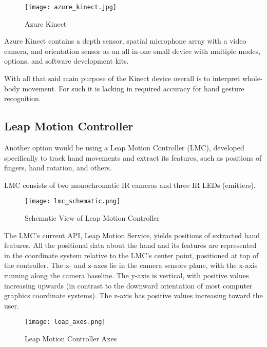 \begin{figure}[ht]
	\centering
    \texttt{[image: azure\_kinect.jpg]}
	\caption{Azure Kinect \cite{azurekinect_pic}}
	\label{fig:azureKincet}
\end{figure}

Azure Kinect contains a depth sensor, spatial microphone array with a video camera, and orientation sensor as an all in-one small device with multiple modes, options, and software development kits.\cite{azurekinect}

With all that said main purpose of the Kinect device overall is to interpret whole-body movement. For such it is lacking in required accuracy for hand gesture recognition. 

\subsection{Leap Motion Controller}

Another option would be using a Leap Motion Controller (LMC), developed specifically to track hand movements and extract its features, such as positions of fingers, hand rotation, and others.

LMC consists of two monochromatic IR cameras and three IR LEDs (emitters). 

\begin{figure}[ht]
	\centering
    \texttt{[image: lmc\_schematic.png]}
	\caption{Schematic View of Leap Motion Controller}
	\label{fig:lmcScheme}
\end{figure}



The LMC's current API, Leap Motion Service, yields positions of extracted hand features. All the positional data about the hand and its features are represented in the coordinate system relative to the LMC's center point, positioned at top of the controller.\cite{LMCanalysis} The x- and z-axes lie in the camera sensors plane, with the x-axis running along the camera baseline. The y-axis is vertical, with positive values increasing upwards (in contrast to the downward orientation of most computer graphics coordinate systems). The z-axis has positive values increasing toward the user.\cite{tomasMultileap}

\begin{figure}[ht]
	\centering
    \texttt{[image: leap\_axes.png]}
	\caption{Leap Motion Controller Axes}
	\label{fig:lmcScheme}
\end{figure}

